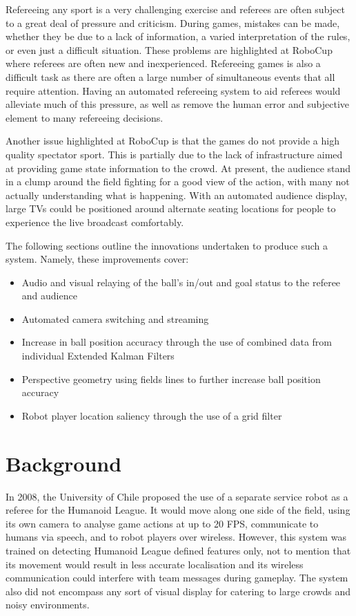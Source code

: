 \documentclass[runningheads,a4paper]{llncs}
\begin{document}
Refereeing any sport is a very challenging exercise and referees are often subject to a great deal of pressure and criticism.
During games, mistakes can be made, whether they be due to a lack of information, a varied interpretation of the rules, or even just a difficult situation.
These problems are highlighted at RoboCup where referees are often new and inexperienced.
Refereeing games is also a difficult task as there are often a large number of simultaneous events that all require attention.
Having an automated refereeing system to aid referees would alleviate much of this pressure, as well as remove the human error and subjective element to many refereeing decisions.

Another issue highlighted at RoboCup is that the games do not provide a high quality spectator sport.
This is partially due to the lack of infrastructure aimed at providing game state information to the crowd.
At present, the audience stand in a clump around the field fighting for a good view of the action, with many not actually understanding what is happening.
With an automated audience display, large TVs could be positioned around alternate seating locations for people to experience the live broadcast comfortably.

The following sections outline the innovations undertaken to produce such a system. Namely, these improvements cover:
\begin{itemize}
\item Audio and visual relaying of the ball's in/out and goal status to the referee and audience
\item Automated camera switching and streaming
\item Increase in ball position accuracy through the use of combined data from individual Extended Kalman Filters
\item Perspective geometry using fields lines to further increase ball position accuracy
\item Robot player location saliency through the use of a grid filter
\end{itemize}

\section{Background}

In 2008, the University of Chile proposed the use of a separate service robot as a referee for the Humanoid League.\cite{Arenas2009}
It would move along one side of the field, using its own camera to analyse game actions at up to 20 FPS, communicate to humans via speech, and to robot players over wireless.
However, this system was trained on detecting Humanoid League defined features only, not to mention that its movement would result in less accurate localisation and its wireless communication could interfere with team messages during gameplay.
The system also did not encompass any sort of visual display for catering to large crowds and noisy environments.
\end{document}
